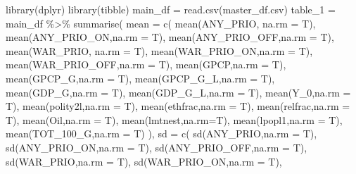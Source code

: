\documentclass[
]{article}
\newenvironment{Shaded}{\begin{snugshade}}{\end{snugshade}}
\newcommand{\AttributeTok}[1]{\textcolor[rgb]{0.77,0.63,0.00}{#1}}
\newcommand{\FunctionTok}[1]{\textcolor[rgb]{0.00,0.00,0.00}{#1}}
\newcommand{\NormalTok}[1]{#1}
\newcommand{\OtherTok}[1]{\textcolor[rgb]{0.56,0.35,0.01}{#1}}
\newcommand{\SpecialCharTok}[1]{\textcolor[rgb]{0.00,0.00,0.00}{#1}}
\newcommand{\StringTok}[1]{\textcolor[rgb]{0.31,0.60,0.02}{#1}}
\begin{document}
\begin{Shaded}
\begin{Highlighting}[]
\FunctionTok{library}\NormalTok{(dplyr)}
\FunctionTok{library}\NormalTok{(tibble)}
\NormalTok{main\_df }\OtherTok{=} \FunctionTok{read.csv}\NormalTok{(}\StringTok{\textquotesingle{}master\_df.csv\textquotesingle{}}\NormalTok{)}
\NormalTok{table\_1 }\OtherTok{=}\NormalTok{ main\_df  }\SpecialCharTok{\%\textgreater{}\%}
  \FunctionTok{summarise}\NormalTok{(}
    \AttributeTok{mean =} \FunctionTok{c}\NormalTok{(}
      \FunctionTok{mean}\NormalTok{(ANY\_PRIO, }\AttributeTok{na.rm =}\NormalTok{ T),}
      \FunctionTok{mean}\NormalTok{(ANY\_PRIO\_ON,}\AttributeTok{na.rm =}\NormalTok{ T),}
      \FunctionTok{mean}\NormalTok{(ANY\_PRIO\_OFF,}\AttributeTok{na.rm =}\NormalTok{ T),}
      \FunctionTok{mean}\NormalTok{(WAR\_PRIO, }\AttributeTok{na.rm =}\NormalTok{ T),}
      \FunctionTok{mean}\NormalTok{(WAR\_PRIO\_ON,}\AttributeTok{na.rm =}\NormalTok{ T),}
      \FunctionTok{mean}\NormalTok{(WAR\_PRIO\_OFF,}\AttributeTok{na.rm =}\NormalTok{ T),}
      \FunctionTok{mean}\NormalTok{(GPCP,}\AttributeTok{na.rm =}\NormalTok{ T),}
      \FunctionTok{mean}\NormalTok{(GPCP\_G,}\AttributeTok{na.rm =}\NormalTok{ T),}
      \FunctionTok{mean}\NormalTok{(GPCP\_G\_L,}\AttributeTok{na.rm =}\NormalTok{ T),}
      \FunctionTok{mean}\NormalTok{(GDP\_G,}\AttributeTok{na.rm =}\NormalTok{ T),}
      \FunctionTok{mean}\NormalTok{(GDP\_G\_L,}\AttributeTok{na.rm =}\NormalTok{ T),}
      \FunctionTok{mean}\NormalTok{(Y\_0,}\AttributeTok{na.rm =}\NormalTok{ T),}
      \FunctionTok{mean}\NormalTok{(polity2l,}\AttributeTok{na.rm =}\NormalTok{ T),}
      \FunctionTok{mean}\NormalTok{(ethfrac,}\AttributeTok{na.rm =}\NormalTok{ T),}
      \FunctionTok{mean}\NormalTok{(relfrac,}\AttributeTok{na.rm =}\NormalTok{ T),}
      \FunctionTok{mean}\NormalTok{(Oil,}\AttributeTok{na.rm =}\NormalTok{ T),}
      \FunctionTok{mean}\NormalTok{(lmtnest,}\AttributeTok{na.rm=}\NormalTok{T),}
      \FunctionTok{mean}\NormalTok{(lpopl1,}\AttributeTok{na.rm =}\NormalTok{ T),}
      \FunctionTok{mean}\NormalTok{(TOT\_100\_G,}\AttributeTok{na.rm =}\NormalTok{ T)}
\NormalTok{    ),}
    \AttributeTok{sd =} \FunctionTok{c}\NormalTok{(}
      \FunctionTok{sd}\NormalTok{(ANY\_PRIO,}\AttributeTok{na.rm =}\NormalTok{ T),}
      \FunctionTok{sd}\NormalTok{(ANY\_PRIO\_ON,}\AttributeTok{na.rm =}\NormalTok{ T),}
      \FunctionTok{sd}\NormalTok{(ANY\_PRIO\_OFF,}\AttributeTok{na.rm =}\NormalTok{ T),}
      \FunctionTok{sd}\NormalTok{(WAR\_PRIO,}\AttributeTok{na.rm =}\NormalTok{ T),}
      \FunctionTok{sd}\NormalTok{(WAR\_PRIO\_ON,}\AttributeTok{na.rm =}\NormalTok{ T),}

\end{Highlighting}
\end{Shaded}
\end{document}
